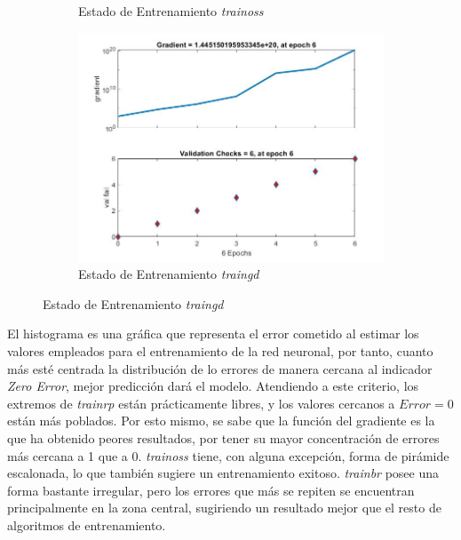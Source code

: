 \documentclass{article}
\begin{document}
\begin{figure}[H]
\begin{subfigure}{0.4\textwidth}
  \caption{Estado de Entrenamiento \textit{trainoss}}
 \end{subfigure}
 \begin{subfigure}{0.4\textwidth}
  \includegraphics[width=0.8\linewidth]{../images/I_ex3_trainingstate_bodyfat_dataset_traingd.jpg}
  \caption{Estado de Entrenamiento \textit{traingd}}
 \end{subfigure}
\end{figure}

El histograma es una gráfica que representa el error cometido al estimar los
valores empleados para el entrenamiento de la red neuronal, por tanto, cuanto
más esté centrada la distribución de lo errores de manera cercana al indicador
\textit{Zero Error}, mejor predicción dará el modelo. Atendiendo a este
criterio, los extremos de \textit{trainrp} están prácticamente libres, y los
valores cercanos a $Error = 0$ están más poblados. Por esto mismo, se sabe que
la función del gradiente es la que ha obtenido peores resultados, por tener su
mayor concentración de errores más cercana a 1 que a 0. \textit{trainoss} tiene,
con alguna excepción, forma de pirámide escalonada, lo que también sugiere un
entrenamiento exitoso. \textit{trainbr} posee una forma bastante irregular, pero
los errores que más se repiten se encuentran principalmente en la zona central,
sugiriendo un resultado mejor que el resto de algoritmos de entrenamiento.
\end{document}
